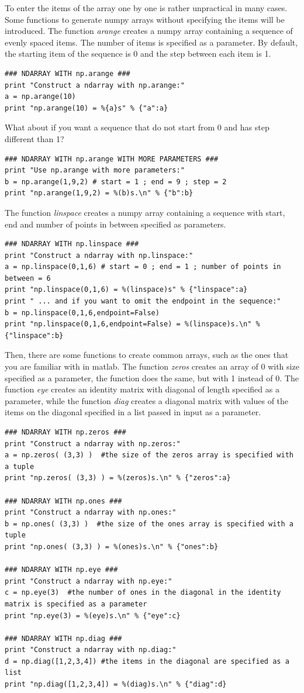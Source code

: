 \documentclass[aps,letterpaper,10pt]{revtex4}
\begin{document}
To enter the items of the array one by one is rather unpractical in many cases. Some functions to generate numpy arrays without specifying the items will be introduced.
The function \textit{arange} creates a numpy array containing a sequence of evenly spaced items. The number of items is specified as a parameter. By default, the starting item of the sequence is 0 and the step between each item is 1.
\begin{lstlisting}
### NDARRAY WITH np.arange ### 
print "Construct a ndarray with np.arange:"
a = np.arange(10)
print "np.arange(10) = %{a}s" % {"a":a} 
\end{lstlisting}
What about if you want a sequence that do not start from 0 and has step different than 1?
\begin{lstlisting}
### NDARRAY WITH np.arange WITH MORE PARAMETERS ###
print "Use np.arange with more parameters:"
b = np.arange(1,9,2) # start = 1 ; end = 9 ; step = 2
print "np.arange(1,9,2) = %(b)s.\n" % {"b":b}
\end{lstlisting}
The function \textit{linspace} creates a numpy array containing a sequence with start, end and number of points in between specified as parameters. 
\begin{lstlisting}
### NDARRAY WITH np.linspace ###
print "Construct a ndarray with np.linspace:"
a = np.linspace(0,1,6) # start = 0 ; end = 1 ; number of points in between = 6
print "np.linspace(0,1,6) = %(linspace)s" % {"linspace":a}
print " ... and if you want to omit the endpoint in the sequence:"
b = np.linspace(0,1,6,endpoint=False)
print "np.linspace(0,1,6,endpoint=False) = %(linspace)s.\n" % {"linspace":b}
\end{lstlisting}
Then, there are some functions to create common arrays, such as the ones that you are familiar with in matlab. The function \textit{zeros} creates an array of 0 with size specified as a parameter, the function  does the same, but with 1 instead of 0. The function \textit{eye} creates an identity matrix with diagonal of length specified as a parameter, while the function \textit{diag} creates a diagonal matrix with values of the items on the diagonal specified in a list passed in input as a parameter.
\begin{lstlisting}
### NDARRAY WITH np.zeros ###
print "Construct a ndarray with np.zeros:"
a = np.zeros( (3,3) )  #the size of the zeros array is specified with a tuple
print "np.zeros( (3,3) ) = %(zeros)s.\n" % {"zeros":a}

### NDARRAY WITH np.ones ###
print "Construct a ndarray with np.ones:"
b = np.ones( (3,3) )  #the size of the ones array is specified with a tuple
print "np.ones( (3,3) ) = %(ones)s.\n" % {"ones":b}

### NDARRAY WITH np.eye ###
print "Construct a ndarray with np.eye:"
c = np.eye(3)  #the number of ones in the diagonal in the identity matrix is specified as a parameter
print "np.eye(3) = %(eye)s.\n" % {"eye":c}

### NDARRAY WITH np.diag ###
print "Construct a ndarray with np.diag:"
d = np.diag([1,2,3,4]) #the items in the diagonal are specified as a list
print "np.diag([1,2,3,4]) = %(diag)s.\n" % {"diag":d}
\end{lstlisting}
\end{document}
